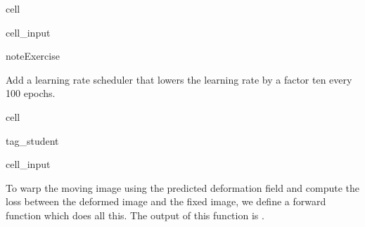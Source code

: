 \documentclass[letterpaper,10pt,english]{jupyterBook}
\begin{document}
\begin{sphinxuseclass}{cell}\begin{sphinxVerbatimInput}

\begin{sphinxuseclass}{cell_input}
\begin{sphinxVerbatim}[commandchars=\\\{\}]
  
  
   
\end{sphinxVerbatim}

\end{sphinxuseclass}\end{sphinxVerbatimInput}

\end{sphinxuseclass}
\begin{sphinxadmonition}{note}{Exercise}

\sphinxAtStartPar
Add a learning rate scheduler that lowers the learning rate by a factor ten every 100 epochs.
\end{sphinxadmonition}

\begin{sphinxuseclass}{cell}
\begin{sphinxuseclass}{tag_student}\begin{sphinxVerbatimInput}

\begin{sphinxuseclass}{cell_input}
\begin{sphinxVerbatim}[commandchars=\\\{\}]
\end{sphinxVerbatim}

\end{sphinxuseclass}\end{sphinxVerbatimInput}

\end{sphinxuseclass}
\end{sphinxuseclass}
\sphinxAtStartPar
To warp the moving image using the predicted deformation field and  compute the loss between the deformed image and the fixed image, we define a forward function which does all this. The output of this function is .
\end{document}
